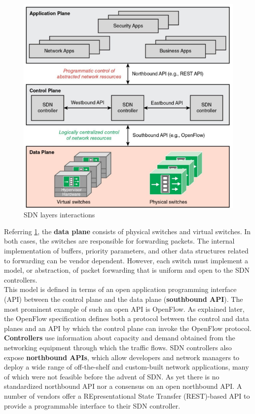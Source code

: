 \documentclass[10pt,a4paper]{report}
\theoremstyle{definition}
\begin{document}
\begin{figure}
	\centering\includegraphics[scale=0.50]{images/Pasted image 20230322112942.png}
	\caption{SDN layers interactions}
	\label{data-plane}
\end{figure}

Referring \ref{data-plane}, the \textbf{data plane} consists of physical switches and virtual switches. In both cases, the switches are responsible for forwarding packets. The internal implementation of buffers, priority parameters, and other data structures related to forwarding can be vendor dependent. However, each switch must implement a model, or abstraction, of packet forwarding that is uniform and open to the SDN controllers.\\ 
This model is defined in terms of an open application programming interface (API) between the control plane and the data plane (\textbf{southbound API}). The most prominent example of such an open API is OpenFlow. As explained later, the OpenFlow specification defines both a protocol between the control and data planes and an API by which the control plane can invoke the OpenFlow protocol.\\

\textbf{Controllers} use information about capacity and demand obtained from the networking equipment through which the traffic flows. SDN controllers also expose \textbf{northbound APIs}, which allow developers and network managers to deploy a wide range of off-the-shelf and custom-built network applications, many of which were not feasible before the advent of SDN. As yet there is no standardized northbound API nor a consensus on an open northbound API. A number of vendors offer a REpresentational State Transfer (REST)-based API to provide a programmable interface to their SDN controller.\\
\end{document}
